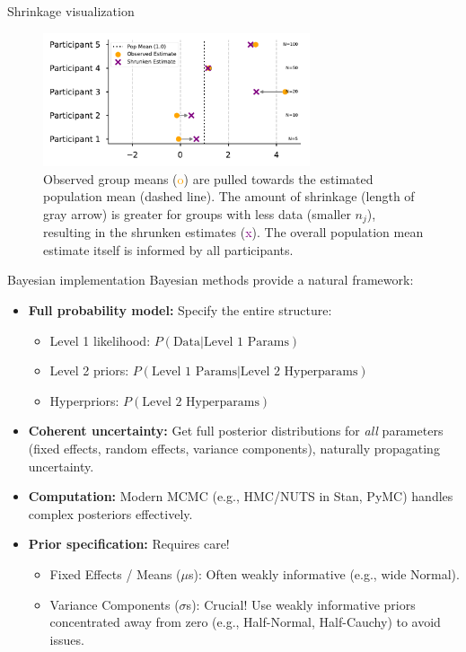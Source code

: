 \documentclass[aspectratio=169]{beamer}
\begin{document}
\begin{frame}{Shrinkage visualization}
    \begin{figure}
        \centering
        \includegraphics[width=0.7\textwidth]{figures/fig_003_shrinkage.pdf}
        \caption{Observed group means (\textcolor{orange}{o}) are pulled towards the estimated population mean (dashed line). The amount of shrinkage (length of gray arrow) is greater for groups with less data (smaller $n_j$), resulting in the shrunken estimates (\textcolor{purple}{x}). The overall population mean estimate itself is informed by all participants.}
    \end{figure}
\end{frame}

\begin{frame}[fragile]{Bayesian implementation}
    Bayesian methods provide a natural framework:
    \pause
    \begin{itemize}
        \item \textbf{Full probability model:} Specify the entire structure:
        \begin{itemize}
            \item Level 1 likelihood: $P(\text{Data} | \text{Level 1 Params})$
            \item Level 2 priors: $P(\text{Level 1 Params} | \text{Level 2 Hyperparams})$
            \item Hyperpriors: $P(\text{Level 2 Hyperparams})$
        \end{itemize}
        \pause
        \item \textbf{Coherent uncertainty:} Get full posterior distributions for \emph{all} parameters (fixed effects, random effects, variance components), naturally propagating uncertainty.
        \pause
        \item \textbf{Computation:} Modern MCMC (e.g., HMC/NUTS in Stan, PyMC) handles complex posteriors effectively.
        \pause
        \item \textbf{Prior specification:} Requires care!
        \begin{itemize}
            \item Fixed Effects / Means ($\mu$s): Often weakly informative (e.g., wide Normal).
            \item Variance Components ($\sigma$s): Crucial! Use weakly informative priors concentrated away from zero (e.g., Half-Normal, Half-Cauchy) to avoid issues.
        \end{itemize}
    \end{itemize}
\end{frame}
\end{document}
